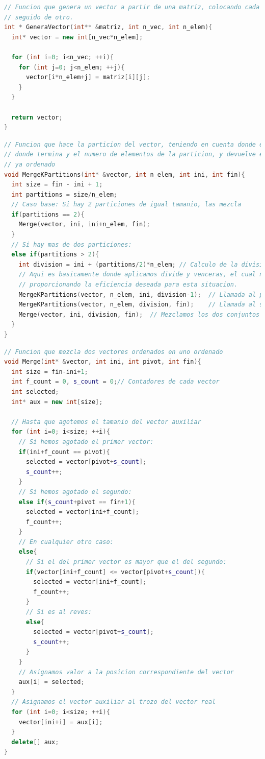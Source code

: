 \begin{lstlisting}[language=c++]
// Funcion que genera un vector a partir de una matriz, colocando cada vector
// seguido de otro.
int * GeneraVector(int** &matriz, int n_vec, int n_elem){
  int* vector = new int[n_vec*n_elem];

  for (int i=0; i<n_vec; ++i){
    for (int j=0; j<n_elem; ++j){
      vector[i*n_elem+j] = matriz[i][j];
    }
  }

  return vector;
}
\end{lstlisting}

\begin{lstlisting}[language=c++]
// Funcion que hace la particion del vector, teniendo en cuenta donde empieza,
// donde termina y el numero de elementos de la particion, y devuelve ese trozo
// ya ordenado
void MergeKPartitions(int* &vector, int n_elem, int ini, int fin){
  int size = fin - ini + 1;
  int partitions = size/n_elem;
  // Caso base: Si hay 2 particiones de igual tamanio, las mezcla
  if(partitions == 2){
    Merge(vector, ini, ini+n_elem, fin);
  }
  // Si hay mas de dos particiones:
  else if(partitions > 2){
    int division = ini + (partitions/2)*n_elem; // Calculo de la division
    // Aqui es basicamente donde aplicamos divide y venceras, el cual nos acaba
    // proporcionando la eficiencia deseada para esta situacion.
    MergeKPartitions(vector, n_elem, ini, division-1);  // Llamada al primer conjunto de particiones
    MergeKPartitions(vector, n_elem, division, fin);    // Llamada al segundo conjunto de particiones
    Merge(vector, ini, division, fin);  // Mezclamos los dos conjuntos de particiones, ya ordenados
  }
}
\end{lstlisting}

\begin{lstlisting}[language=c++]
// Funcion que mezcla dos vectores ordenados en uno ordenado
void Merge(int* &vector, int ini, int pivot, int fin){
  int size = fin-ini+1;
  int f_count = 0, s_count = 0;// Contadores de cada vector
  int selected;
  int* aux = new int[size];

  // Hasta que agotemos el tamanio del vector auxiliar
  for (int i=0; i<size; ++i){
    // Si hemos agotado el primer vector:
    if(ini+f_count == pivot){
      selected = vector[pivot+s_count];
      s_count++;
    }
    // Si hemos agotado el segundo:
    else if(s_count+pivot == fin+1){
      selected = vector[ini+f_count];
      f_count++;
    }
    // En cualquier otro caso:
    else{
      // Si el del primer vector es mayor que el del segundo:
      if(vector[ini+f_count] <= vector[pivot+s_count]){
        selected = vector[ini+f_count];
        f_count++;
      }
      // Si es al reves:
      else{
        selected = vector[pivot+s_count];
        s_count++;
      }
    }
    // Asignamos valor a la posicion correspondiente del vector
    aux[i] = selected;
  }
  // Asignamos el vector auxiliar al trozo del vector real
  for (int i=0; i<size; ++i){
    vector[ini+i] = aux[i];
  }
  delete[] aux;
}
\end{lstlisting}


